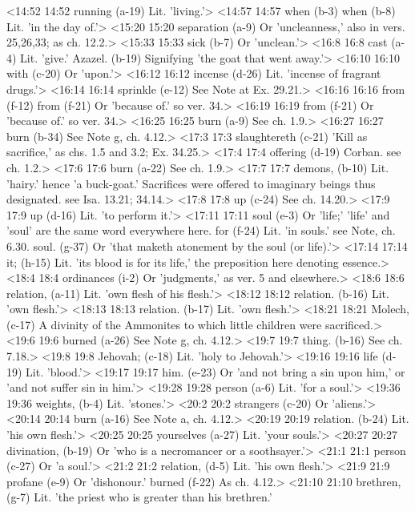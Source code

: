 <14:52 14:52  running (a-19)  Lit. 'living.'>
<14:57 14:57  when (b-3)  when (b-8)
  Lit. 'in the day of.'>
<15:20 15:20  separation (a-9)  Or 'uncleanness,' also in vers. 25,26,33; as ch. 12.2.>
<15:33 15:33  sick (b-7)  Or 'unclean.'>
<16:8 16:8  cast (a-4)  Lit. 'give.'
  Azazel. (b-19)  Signifying 'the goat that went away.'>
<16:10 16:10  with (c-20)  Or 'upon.'>
<16:12 16:12  incense (d-26)  Lit. 'incense of fragrant drugs.'>
<16:14 16:14  sprinkle (e-12)  See Note at Ex. 29.21.>
<16:16 16:16  from (f-12)  from (f-21)
  Or 'because of.' so ver. 34.>
<16:19 16:19  from (f-21)  Or 'because of.' so ver. 34.>
<16:25 16:25  burn (a-9)  See ch. 1.9.>
<16:27 16:27  burn (b-34)  See Note g, ch. 4.12.>
<17:3 17:3  slaughtereth (c-21)  'Kill as sacrifice,' as chs. 1.5 and 3.2; Ex. 34.25.>
<17:4 17:4  offering (d-19)  Corban. see ch. 1.2.>
<17:6 17:6  burn (a-22)  See ch. 1.9.>
<17:7 17:7  demons, (b-10)  Lit. 'hairy.' hence 'a buck-goat.' Sacrifices were offered to  imaginary beings thus designated. see Isa. 13.21; 34.14.>
<17:8 17:8  up (c-24)  See ch. 14.20.>
<17:9 17:9  up (d-16)  Lit. 'to perform it.'>
<17:11 17:11  soul (e-3)  Or 'life;' 'life' and 'soul' are the same word everywhere  here.
  for (f-24)  Lit. 'in souls.' see Note, ch. 6.30.
  soul. (g-37)  Or 'that maketh atonement by the soul (or life).'>
<17:14 17:14  it; (h-15)  Lit. 'its blood is for its life,' the preposition here  denoting essence.>
<18:4 18:4  ordinances (i-2)  Or 'judgments,' as ver. 5 and elsewhere.>
<18:6 18:6  relation, (a-11)  Lit. 'own flesh of his flesh.'>
<18:12 18:12  relation. (b-16) Lit. 'own flesh.'>
<18:13 18:13  relation. (b-17)  Lit. 'own flesh.'>
<18:21 18:21  Molech, (c-17)  A divinity of the Ammonites to which little children were  sacrificed.>
<19:6 19:6  burned (a-26)  See Note g, ch. 4.12.>
<19:7 19:7  thing. (b-16)  See ch. 7.18.>
<19:8 19:8  Jehovah; (c-18)  Lit. 'holy to Jehovah.'>
<19:16 19:16  life (d-19)  Lit. 'blood.'>
<19:17 19:17  him. (e-23)  Or 'and not bring a sin upon him,' or 'and not suffer sin in  him.'>
<19:28 19:28  person (a-6)  Lit. 'for a soul.'>
<19:36 19:36  weights, (b-4)  Lit. 'stones.'>
<20:2 20:2  strangers (c-20)  Or 'aliens.'>
<20:14 20:14  burn (a-16)  See Note a, ch. 4.12.>
<20:19 20:19  relation. (b-24)  Lit. 'his own flesh.'>
<20:25 20:25  yourselves (a-27)  Lit. 'your souls.'>
<20:27 20:27  divination, (b-19)  Or 'who is a necromancer or a soothsayer.'>
<21:1 21:1  person (c-27)  Or 'a soul.'>
<21:2 21:2  relation, (d-5)  Lit. 'his own flesh.'>
<21:9 21:9  profane (e-9)  Or 'dishonour.'
  burned (f-22)  As ch. 4.12.>
<21:10 21:10  brethren, (g-7)  Lit. 'the priest who is greater than his brethren.'
